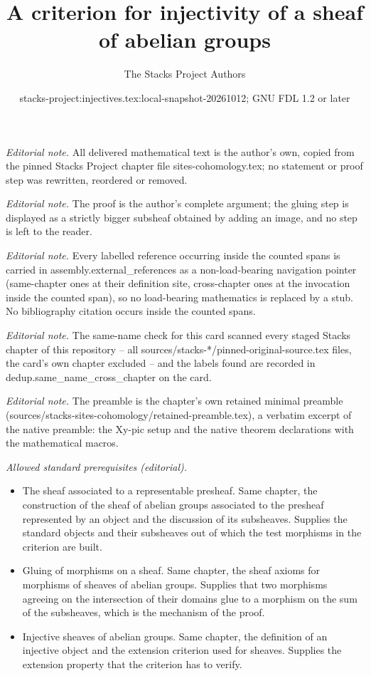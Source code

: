 \documentclass[10pt,a4paper]{amsart}
\title{A criterion for injectivity of a sheaf of abelian groups}
\author{The Stacks Project Authors}
\date{stacks-project:injectives.tex:local-snapshot-20261012; GNU FDL 1.2 or later}
\theoremstyle{plain}
\theoremstyle{definition}
\theoremstyle{remark}
\numberwithin{equation}{subsection}
\begin{document}
\maketitle
\noindent\textit{Editorial note.} All delivered mathematical text is the author's own, copied from the pinned Stacks Project chapter file sites-cohomology.tex; no statement or proof step was rewritten, reordered or removed.\par\medskip
\noindent\textit{Editorial note.} The proof is the author's complete argument; the gluing step is displayed as a strictly bigger subsheaf obtained by adding an image, and no step is left to the reader.\par\medskip
\noindent\textit{Editorial note.} Every labelled reference occurring inside the counted spans is carried in assembly.external\_references as a non-load-bearing navigation pointer (same-chapter ones at their definition site, cross-chapter ones at the invocation inside the counted span), so no load-bearing mathematics is replaced by a stub. No bibliography citation occurs inside the counted spans.\par\medskip
\noindent\textit{Editorial note.} The same-name check for this card scanned every staged Stacks chapter of this repository -- all sources/stacks-*/pinned-original-source.tex files, the card's own chapter excluded -- and the labels found are recorded in dedup.same\_name\_cross\_chapter on the card.\par\medskip
\noindent\textit{Editorial note.} The preamble is the chapter's own retained minimal preamble (sources/stacks-sites-cohomology/retained-preamble.tex), a verbatim excerpt of the native preamble: the Xy-pic setup and the native theorem declarations with the mathematical macros.\par\medskip
\noindent\textit{Allowed standard prerequisites (editorial).}\begin{itemize}
\item The sheaf associated to a representable presheaf. Same chapter, the construction of the sheaf of abelian groups associated to the presheaf represented by an object and the discussion of its subsheaves. Supplies the standard objects and their subsheaves out of which the test morphisms in the criterion are built.
\item Gluing of morphisms on a sheaf. Same chapter, the sheaf axioms for morphisms of sheaves of abelian groups. Supplies that two morphisms agreeing on the intersection of their domains glue to a morphism on the sum of the subsheaves, which is the mechanism of the proof.
\item Injective sheaves of abelian groups. Same chapter, the definition of an injective object and the extension criterion used for sheaves. Supplies the extension property that the criterion has to verify.
\end{itemize}\medskip
\end{document}
